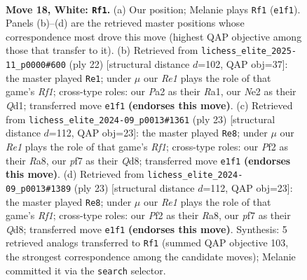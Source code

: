 \documentclass[11pt]{article}
\begin{document}
\begin{figure}[p]
\label{fig:thought-m32}
\end{figure}

\clearpage

\begin{figure}[p]\centering
\begin{subfigure}{0.46\textwidth}\centering
\resizebox{\linewidth}{!}{%
\newchessgame
\chessboard[
  setfen={rnr2bk1/1p1b1ppp/p1q1pn2/B7/7N/3BP3/PP2NPPP/R2QR1K1 w - - 16 18},
  showmover=false,
  pgfstyle=straightmove, color=movearrow, markmove={e1-f1}
]}
\caption{}
\end{subfigure}\hfill
\begin{subfigure}{0.46\textwidth}\centering
\resizebox{\linewidth}{!}{%
\newchessgame
\chessboard[
  setfen={r1bq1rk1/pp2bppp/2n2n2/3p4/8/PNNB4/1PPB1PPP/R2Q1RK1 w - - 1 12},
  showmover=false,
  pgfstyle=straightmove, color=movearrow, markmove={f1-e1}
]}
\caption{}
\end{subfigure}
\\[4pt]
\begin{subfigure}{0.46\textwidth}\centering
\resizebox{\linewidth}{!}{%
\newchessgame
\chessboard[
  setfen={r1bq1rk1/p4pp1/2pb1n1p/n3p3/8/2NB1N2/PPPP1PPP/R1BQR1K1 b - - 3 12},
  showmover=false,
  pgfstyle=straightmove, color=movearrow, markmove={f8-e8}
]}
\caption{}
\end{subfigure}\hfill
\begin{subfigure}{0.46\textwidth}\centering
\resizebox{\linewidth}{!}{%
\newchessgame
\chessboard[
  setfen={r1bq1rk1/p4pp1/2pb1n1p/n3p3/8/2NB1N2/PPPP1PPP/R1BQR1K1 b - - 3 12},
  showmover=false,
  pgfstyle=straightmove, color=movearrow, markmove={f8-e8}
]}
\caption{}
\end{subfigure}
\caption{\textbf{Move 18, White: \texttt{Rf1}.} (a) Our position; Melanie plays \texttt{Rf1} (\texttt{e1f1}). Panels (b)--(d) are the retrieved master positions whose correspondence most drove this move (highest QAP objective among those that transfer to it). (b) Retrieved from \texttt{lichess\_elite\_2025-11\_p0000\#600} (ply 22) [structural distance $d$=102, QAP obj=37]: the master played \texttt{Re1}; under $\mu$ our \emph{Re1} plays the role of that game's \emph{Rf1}; cross-type roles: our \emph{P}a2 as their \emph{R}a1, our \emph{N}e2 as their \emph{Q}d1; transferred move \texttt{e1f1} \textbf{(endorses this move)}. (c) Retrieved from \texttt{lichess\_elite\_2024-09\_p0013\#1361} (ply 23) [structural distance $d$=112, QAP obj=23]: the master played \texttt{Re8}; under $\mu$ our \emph{Re1} plays the role of that game's \emph{Rf1}; cross-type roles: our \emph{P}f2 as their \emph{R}a8, our \emph{p}f7 as their \emph{Q}d8; transferred move \texttt{e1f1} \textbf{(endorses this move)}. (d) Retrieved from \texttt{lichess\_elite\_2024-09\_p0013\#1389} (ply 23) [structural distance $d$=112, QAP obj=23]: the master played \texttt{Re8}; under $\mu$ our \emph{Re1} plays the role of that game's \emph{Rf1}; cross-type roles: our \emph{P}f2 as their \emph{R}a8, our \emph{p}f7 as their \emph{Q}d8; transferred move \texttt{e1f1} \textbf{(endorses this move)}. Synthesis: 5 retrieved analogs transferred to \texttt{Rf1} (summed QAP objective 103, the strongest correspondence among the candidate moves); Melanie committed it via the \texttt{search} selector.}

\end{figure}
\end{document}
